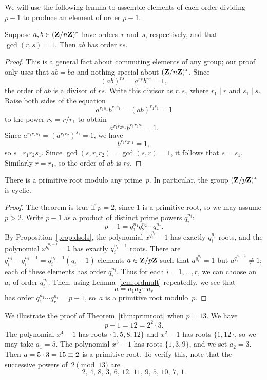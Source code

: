 We will use the following lemma to assemble elements of
each order dividing $p-1$ to produce an
element of order $p-1$.
\begin{lemma}\label{lem:ordmult}
  Suppose $a,b\in(\mathbf{Z}/n\mathbf{Z}{})^*$ have orders~$r$ and~$s$, respectively,
  and that $\gcd(r,s)=1$.  Then $ab$ has order $rs$.
\end{lemma}
\begin{proof}
This is a general fact about commuting elements of any group; our proof
only uses that $ab=ba$ and nothing special about $(\mathbf{Z}/n\mathbf{Z}{})^*$.  Since
$$
  (ab)^{rs} = a^{rs}b^{rs}=1,
$$
the order of $ab$ is a divisor of $rs$.
Write this divisor as $r_1 s_1$ where $r_1\mid r$
and $s_1\mid s$.
Raise both sides of the equation
$$
  a^{r_1 s_1}b^{r_1 s_1} = (ab)^{r_1 s_1} = 1
$$
to the power $r_2 = r/r_1$ to obtain
$$
   a^{r_1 r_2 s_1} b^{r_1 r_2 s_1} = 1.
$$
Since $a^{r_1 r_2 s_1} = (a^{r_1 r_2})^{s_1} = 1$,  we have
$$
  b^{r_1 r_2 s_1} = 1,
$$
so $s\mid r_1 r_2 s_1$.
Since $\gcd(s,r_1 r_2)=\gcd(s,r) = 1$, it follows that $s=s_1$.
Similarly $r=r_1$, so the order of $ab$ is $rs$.
\end{proof}


\begin{theorem}\label{thm:primroot}
There is a primitive root modulo any prime~$p$.  In particular,
the group $(\mathbf{Z}/p\mathbf{Z}{})^*$ is cyclic.
\end{theorem}
\begin{proof}
The theorem is true if $p=2$, since $1$ is a primitive root, so  we may assume
$p>2$.
Write $p-1$ as a product of distinct prime powers $q_i^{n_i}$:
$$
  p-1 = q_1^{n_1}q_2^{n_2}\cdots q_r^{n_r}.
$$
By Proposition~\ref{prop:dsols},
the polynomial $x^{q_i^{n_i}}-1$ has exactly
$q_i^{n_i}$ roots, and the polynomial
$x^{q_i^{n_i-1}}-1$ has exactly
$q_i^{n_i-1}$ roots.
There are $q_i^{n_i} - q_i^{n_i-1}=q_i^{n_i-1}(q_i-1)$ elements
$a\in\mathbf{Z}/p\mathbf{Z}{}$ such
that $a^{q_i^{n_i}}=1$ but $a^{q_i^{n_i-1}}\neq 1$;
each of these elements has order $q_i^{n_i}$.
Thus for each $i=1,\ldots, r$, we can choose an $a_i$ of order $q_i^{n_i}$.
Then, using Lemma~\ref{lem:ordmult} repeatedly, we see that
$$
   a = a_1 a_2 \cdots a_r
$$
has order
   $q_1^{n_1}\cdots q_r^{n_r} = p-1$,
so~$a$ is a primitive root modulo~$p$.
\end{proof}


\begin{example}
We illustrate the proof of Theorem~\ref{thm:primroot} when $p=13$.   We have
$$
  p-1 = 12 = 2^2\cdot 3.
$$
The polynomial $x^4 - 1$ has roots $\{1,5,8,12\}$ and
$x^2-1$ has roots $\{1,12\}$, so we may take $a_1=5$.
The polynomial $x^3-1$ has roots $\{1,3,9\}$, and we set $a_2=3$.
Then $a=5\cdot 3=15\equiv 2$ is a primitive root.
To verify this, note that
the successive powers of~$2\pmod{13}$ are
$$
  2,\, 4,\, 8,\,  3,\,  6,\,  12,\,  11,\,  9,\,  5,\,  10,\,  7,\,  1.
$$
\end{example}

